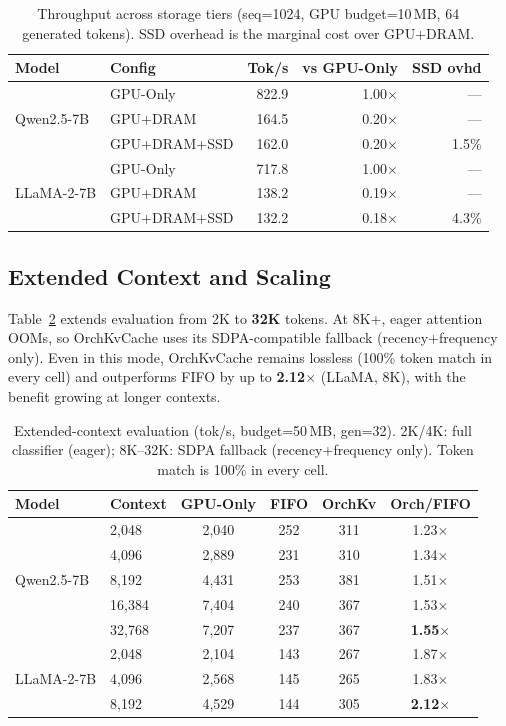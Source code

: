 \documentclass[conference]{IEEEtran}
\begin{document}
\begin{table}[t]
\centering
\caption{Throughput across storage tiers (seq=1024, GPU budget=10\,MB, 64 generated tokens). SSD overhead is the marginal cost over GPU+DRAM.}
\label{tab:tier-throughput}
\footnotesize
\setlength{\tabcolsep}{4pt}
\begin{tabular}{@{}llrrr@{}}
\toprule
Model & Config & Tok/s & vs GPU-Only & SSD ovhd \\
\midrule
\multirow{3}{*}{Qwen2.5-7B}
& GPU-Only     & 822.9 & 1.00$\times$ & --- \\
& GPU+DRAM     & 164.5 & 0.20$\times$ & --- \\
& GPU+DRAM+SSD & 162.0 & 0.20$\times$ & 1.5\% \\
\midrule
\multirow{3}{*}{LLaMA-2-7B}
& GPU-Only     & 717.8 & 1.00$\times$ & --- \\
& GPU+DRAM     & 138.2 & 0.19$\times$ & --- \\
& GPU+DRAM+SSD & 132.2 & 0.18$\times$ & 4.3\% \\
\bottomrule
\end{tabular}
\end{table}

\subsection{Extended Context and Scaling}
\label{sec:scale}

Table~\ref{tab:scale} extends evaluation from 2K to \textbf{32K} tokens. At 8K+, eager attention OOMs, so OrchKvCache uses its SDPA-compatible fallback (recency+frequency only). Even in this mode, OrchKvCache remains lossless (100\% token match in every cell) and outperforms FIFO by up to \textbf{2.12$\times$} (LLaMA, 8K), with the benefit growing at longer contexts.

\begin{table}[t]
\centering
\caption{Extended-context evaluation (tok/s, budget=50\,MB, gen=32). 2K/4K: full classifier (eager); 8K--32K: SDPA fallback (recency+frequency only). Token match is 100\% in every cell.}
\label{tab:scale}
\small
\begin{tabular}{@{}llcccc@{}}
\toprule
Model & Context & GPU-Only & FIFO & OrchKv & Orch/FIFO \\
\midrule
\multirow{5}{*}{Qwen2.5-7B}
& 2{,}048  & 2{,}040 & 252  & 311  & 1.23$\times$ \\
& 4{,}096  & 2{,}889 & 231  & 310  & 1.34$\times$ \\
& 8{,}192  & 4{,}431 & 253  & 381  & 1.51$\times$ \\
& 16{,}384 & 7{,}404 & 240  & 367  & 1.53$\times$ \\
& 32{,}768 & 7{,}207 & 237  & 367  & \textbf{1.55$\times$} \\
\midrule
\multirow{3}{*}{LLaMA-2-7B}
& 2{,}048  & 2{,}104 & 143  & 267  & 1.87$\times$ \\
& 4{,}096  & 2{,}568 & 145  & 265  & 1.83$\times$ \\
& 8{,}192  & 4{,}529 & 144  & 305  & \textbf{2.12$\times$} \\
\bottomrule
\end{tabular}
\end{table}
\end{document}
